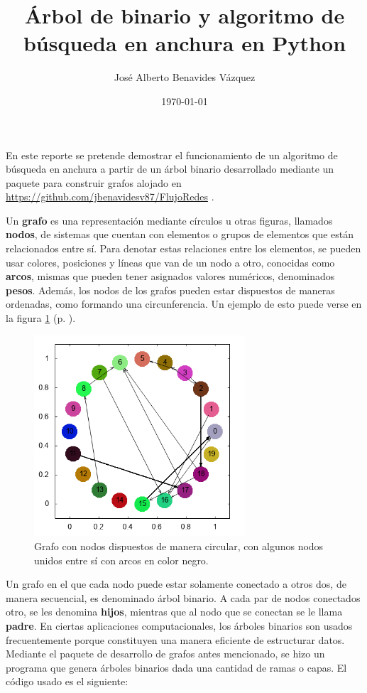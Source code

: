 \documentclass{article}
\title{Árbol de binario y algoritmo de búsqueda en anchura en Python}
\author{José Alberto Benavides Vázquez}
\date{\today}
\begin{document}
  \maketitle

  En este reporte se pretende demostrar el funcionamiento de un algoritmo de búsqueda en anchura a partir de un árbol binario desarrollado mediante un paquete para construir grafos alojado en \url{https://github.com/jbenavidesv87/FlujoRedes} \cite{Grafos}.

  Un \textbf{grafo} es una representación mediante círculos u otras figuras, llamados \textbf{nodos}, de sistemas que cuentan con elementos o grupos de elementos que están relacionados entre sí. Para denotar estas relaciones entre los elementos, se pueden usar colores, posiciones y líneas que van de un nodo a otro, conocidas como \textbf{arcos}, mismas que pueden tener asignados valores numéricos, denominados \textbf{pesos}. Además, los nodos de los grafos pueden estar dispuestos de maneras ordenadas, como formando una circunferencia. Un ejemplo de esto puede verse en la figura \ref{grafoCircular} (p. \pageref{grafoCircular}).

  \begin{figure}[h]
    \includegraphics[width=0.7\textwidth]{grafoCircular}
    \centering
    \caption{Grafo con nodos dispuestos de manera circular, con algunos nodos unidos entre sí con arcos en color negro.}
    \label{grafoCircular}
  \end{figure}

  Un grafo en el que cada nodo puede estar solamente conectado a otros dos, de manera secuencial, es denominado árbol binario. A cada par de nodos conectados otro, se les denomina \textbf{hijos}, mientras que al nodo que se conectan se le llama \textbf{padre}. En ciertas aplicaciones computacionales, los árboles binarios son usados frecuentemente porque constituyen una manera eficiente de estructurar datos\cite{artComputerProgramming}. Mediante el paquete de desarrollo de grafos antes mencionado, se hizo un programa que genera árboles binarios dada una cantidad de ramas o capas. El código usado es el siguiente:
\end{document}

